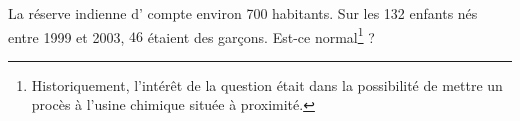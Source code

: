 
\begin{exercice}\label{exosmath-0376}

    La réserve indienne d' compte environ 700 habitants. Sur les 132 enfants nés entre 1999 et 2003, \( 46\)  étaient des garçons. Est-ce normal\footnote{Historiquement, l'intérêt de la question était dans la possibilité de mettre un procès à l'usine chimique située à proximité.} ?

\end{exercice}
